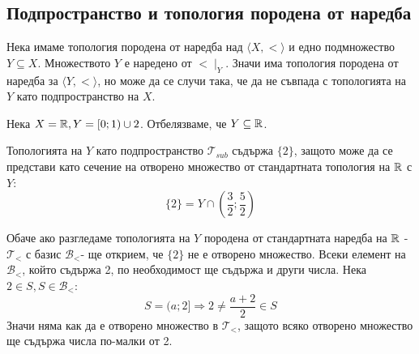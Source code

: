 \subsection{Подпространство и топология породена от наредба}
Нека имаме топология породена от наредба над $\langle X, < \rangle$ и едно подмножество $Y \subseteq X$. Множеството $Y$ е наредено от $< \mid_Y$. Значи има топология породена от наредба за $\langle Y, < \rangle$, но може да се случи така, че да не съвпада с топологията на $Y$ като подпространство на $X$.
\begin{example}
    Нека $X = {\mathbb{R}}, Y = [0; 1) \cup {2}$. Отбелязваме, че $Y \subseteq {\mathbb{R}}$.
    
    Топологията на $Y$ като подпространство $\mathcal T_{sub}$ съдържа $\{2\}$, защото може да се представи като сечение на отворено множество от стандартната топология на ${\mathbb{R}}$ с $Y$:
    \begin{equation}
        \{2\} = Y \cap \left(\frac{3}{2}; \frac{5}{2}\right)
    \end{equation}

    Обаче ако разгледаме топологията на $Y$ породена от стандартната наредба на ${\mathbb{R}}$ - $\mathcal T_<$ с базис $\mathcal B_<$-  ще открием, че $\{2\}$ не е отворено множество. Всеки елемент на $\mathcal B_<$, който съдържа 2, по необходимост ще съдържа и други числа. Нека $2 \in S, S \in \mathcal B_<$:
    \begin{equation}
        S = (a; 2] \Rightarrow 2 \neq \frac{a + 2}{2} \in S
    \end{equation}
    Значи няма как да е отворено множество в $\mathcal T_<$, защото всяко отворено множество ще съдържа числа по-малки от 2.
\end{example}

